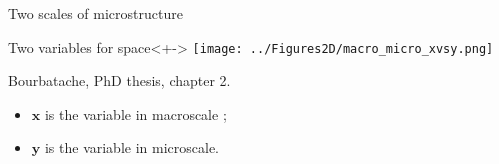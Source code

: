 \begin{frame}{Two scales of microstructure}
%
%
\begin{block}{Two variables for space}<+->
%
\texttt{[image: ../Figures2D/macro\_micro\_xvsy.png]}

\par
Bourbatache, PhD thesis, chapter 2.
%
\begin{itemize}
\item<+-> $\mathbf{x}$ is the variable in macroscale ;
\item<+-> $\mathbf{y}$ is the variable in microscale.
\end{itemize}
%
\end{block}
%
\end{frame}

